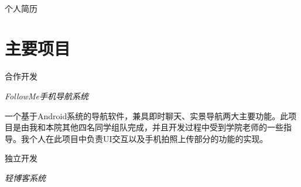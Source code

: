 \documentclass[10pt]{article} %
\begin{document}
\color{text1} %


\par{\\ %
{\color{headings} 个人简历 \\[15pt]\par} %
	

\begin{minipage}[t]{0.5\textwidth} %
\vspace{0pt} %
	

\section{主要项目} 


{\raggedleft\textsc{合作开发}\par}

{\raggedright\large \textit{FollowMe手机导航系统}\\[5pt]}
\normalsize{一个基于Android系统的导航软件，兼具即时聊天、实景导航两大主要功能。此项目是由我和本院其他四名同学组队完成，并且开发过程中受到学院老师的一些指导。我个人在此项目中负责UI交互以及手机拍照上传部分的功能的实现。}\\


{\raggedleft\textsc{独立开发}\par}

{\raggedright\large \textit{轻博客系统}\\[5pt]}


\end{minipage}}
\end{document}
